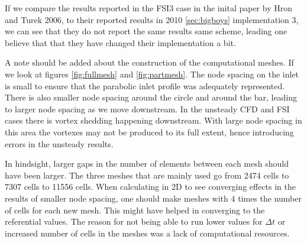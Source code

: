 If we compare the results reported in the FSI3 case in the inital paper by Hron and Turek 2006, to their reported results in 2010 \ref{sec:bigboys} implementation 3, we can see that they do not report the same results same scheme, leading one believe that that they have changed their implementation a bit. 

A note should be added about the construction of the computational meshes. If we look at figures \ref{fig:fullmesh} and \ref{fig:partmesh}. The node spacing on the inlet is small to ensure that the parabolic inlet profile was adequately represented. There is also smaller node spacing around the circle and around the bar, leading to larger node spacing as we move downstream. In the unsteady CFD and FSI cases there is vortex shedding happening downstream. With large node spacing in this area the vortexes may not be produced to its full extent, hence introducing errors in the unsteady results. 

In hindsight, larger gaps in the number of elements between each mesh should have been larger. The three meshes that are mainly used go from 2474 cells to 7307 cells to 11556 cells. When calculating in 2D to see converging effects in the results of smaller node spacing, one should make meshes with 4 times the number of cells for each new mesh. This might have helped in converging to the referential values. The reason for not being able to run lower values for $\Delta t$ or increased number of cells in the meshes was a lack of computational resources.

